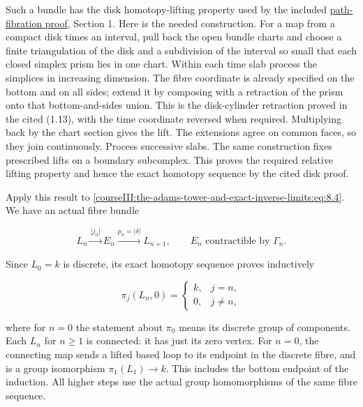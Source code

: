 Such a bundle has the disk homotopy-lifting property used by the included \href{https://github.com/KokunoYumeto/open-math-courses/blob/98715557b25d715076184ec098089ebae34ea9f6/docs/courses/CG-S6/src/path-fibres-and-integral-homotopy-equivalences.md}{path-fibration proof}, Section 1. Here is the needed construction. For a map from a compact disk times an interval, pull back the open bundle charts and choose a finite triangulation of the disk and a subdivision of the interval so small that each closed simplex prism lies in one chart. Within each time slab process the simplices in increasing dimension. The fibre coordinate is already specified on the bottom and on all sides; extend it by composing with a retraction of the prism onto that bottom-and-sides union. This is the disk-cylinder retraction proved in the cited (1.13), with the time coordinate reversed when required. Multiplying back by the chart section gives the lift. The extensions agree on common faces, so they join continuously. Process successive slabs. The same construction fixes prescribed lifts on a boundary subcomplex. This proves the required relative lifting property and hence the exact homotopy sequence by the cited disk proof.

Apply this result to \eqref{courseIII:the-adams-tower-and-exact-inverse-limits:eq:8.4}. We have an actual fibre bundle

\begin{equation}
L_n\xrightarrow{|j_n|}E_n\xrightarrow{p_n=|\delta|}L_{n+1},
 \qquad E_n\text{ contractible by }\Gamma_n.
 \label{courseIII:the-adams-tower-and-exact-inverse-limits:eq:9.4}
\end{equation}

Since \(L_0=k\) is discrete, its exact homotopy sequence proves inductively

\begin{equation}
\pi_j(L_n,0)=
 \begin{cases}k,&j=n,\\0,&j\ne n,
 \end{cases}
 \label{courseIII:the-adams-tower-and-exact-inverse-limits:eq:9.5}
\end{equation}

where for \(n=0\) the statement about \(\pi_0\) means its discrete group of components. Each \(L_n\) for \(n\geq1\) is connected: it has just its zero vertex. For \(n=0\), the connecting map sends a lifted based loop to its endpoint in the discrete fibre, and is a group isomorphism \(\pi_1(L_1)\to k\). This includes the bottom endpoint of the induction. All higher steps use the actual group homomorphisms of the same fibre sequence.

